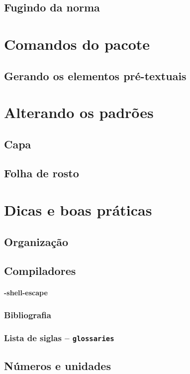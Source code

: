\documentclass[openright]{memoir}
\begin{document}
\section{Fugindo da norma}

\chapter{Comandos do pacote}
\section{Gerando os elementos pré-textuais}


\chapter{Alterando os padrões}
\label{customização}
\section{Capa}
\section{Folha de rosto}


\chapter{Dicas e boas práticas}
\section{Organização}
\section{Compiladores}
\subsubsection{-shell-escape}
\subsection{Bibliografia}
\subsection{Lista de siglas -- \texttt{glossaries}}
\section{Números e unidades}
\end{document}
